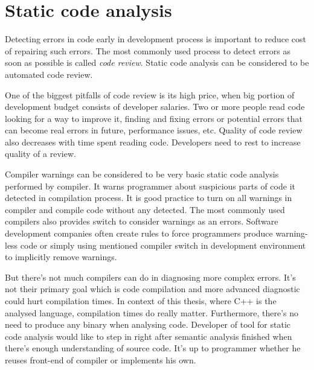 \chapter{Static code analysis}
Detecting errors in code early in development process is important to reduce cost of repairing such errors. The most commonly used process to detect errors as soon as possible is called \emph{code review}. Static code analysis can be considered to be automated code review.

One of the biggest pitfalls of code review is its high price, when big portion of development budget consists of developer salaries. Two or more people read code looking for a way to improve it, finding and fixing errors or potential errors that can become real errors in future, performance issues, etc. Quality of code review also decreases with time spent reading code. Developers need to rest to increase quality of a review.

Compiler warnings can be considered to be very basic static code analysis performed by compiler. It warns programmer about suspicious parts of code it detected in compilation process. It is good practice to turn on all warnings in compiler and compile code without any detected. The most commonly used compilers also provides switch to consider warnings as an errors. Software development companies often create rules to force programmers produce warning-less code or simply using mentioned compiler switch in development environment to implicitly remove warnings.

But there's not much compilers can do in diagnosing more complex errors. It's not their primary goal which is code compilation and more advanced diagnostic could hurt compilation times. In context of this thesis, where C++  is the analysed language, compilation times do really matter. Furthermore, there's no need to produce any binary when analysing code. Developer of tool for static code analysis would like to step in right after semantic analysis finished when there's enough understanding of source code. It's up to programmer whether he reuses front-end of compiler or implements his own.

